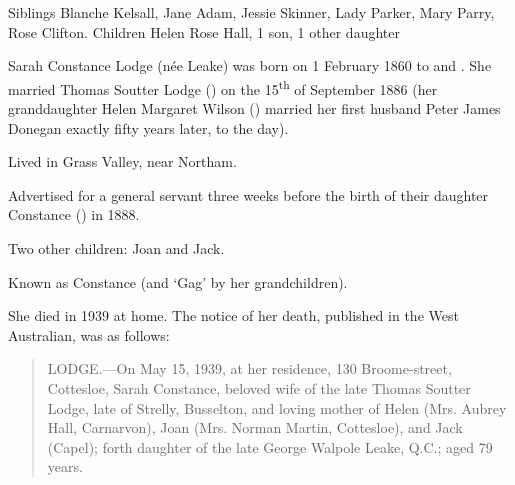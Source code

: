 

Siblings 	Blanche Kelsall, Jane Adam, Jessie Skinner, Lady Parker, Mary Parry, Rose Clifton.
Children 	Helen Rose Hall, 1 son, 1 other daughter

Sarah Constance Lodge (n\'{e}e Leake) was born on 1 February 1860 to  and .
She married Thomas Soutter Lodge () on the 15\textsuperscript{th} of September 1886
(her granddaughter Helen Margaret Wilson () married her first husband Peter James Donegan exactly fifty years later, to the day\cite{HMWnote}).

Lived in Grass Valley, near Northam.\cite{ServantAd}

Advertised for a general servant three weeks before the birth of their daughter Constance () in 1888.\cite{ServantAd}

Two other children: Joan and Jack.\cite{SCLdeathNotice}

Known as Constance (and `Gag' by her grandchildren).

She died in 1939 at home.
The notice of her death, published in the West Australian, was as follows:\cite{SCLdeathNotice}

\begin{quotation}
LODGE.---On May 15, 1939, at her residence, 130 Broome-street, Cottesloe, Sarah Constance,
beloved wife of the late Thomas Soutter Lodge, late of Strelly, Busselton, and loving mother of
Helen (Mrs. Aubrey Hall, Carnarvon), Joan (Mrs. Norman Martin, Cottesloe), and Jack (Capel);
forth daughter of the late George Walpole Leake, Q.C.; aged 79 years.
\end{quotation}
